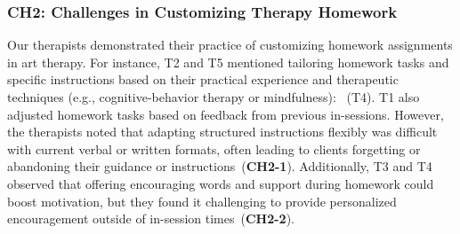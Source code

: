 
\subsubsection{\textbf{CH2}: Challenges in Customizing Therapy Homework} 

Our therapists demonstrated their practice of customizing homework assignments in art therapy. For instance, T2 and T5 mentioned tailoring homework tasks and specific instructions based on their practical experience and therapeutic techniques (e.g., cognitive-behavior therapy or mindfulness): ~(T4). T1 also adjusted homework tasks based on feedback from previous in-sessions.
However, the therapists noted that adapting structured instructions flexibly was difficult with current verbal or written formats, often leading to clients forgetting or abandoning their guidance or instructions~(\textbf{CH2-1}). Additionally, T3 and T4 observed that offering encouraging words and support during homework could boost motivation, but they found it challenging to provide personalized encouragement outside of in-session times~(\textbf{CH2-2}).

